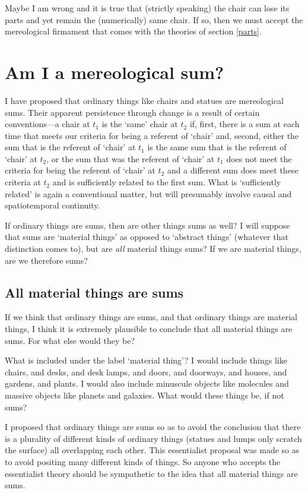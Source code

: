 \documentclass[11pt]{article}
\begin{document}
\begin{spacing}{1.5}
Maybe I am wrong and it is true that (strictly speaking) the chair can
lose its parts and yet remain the (numerically) same chair.  If so,
then we must accept the mereological firmament that comes with the
theories of section \ref{parts}.

\section{Am I a mereological sum?}
\label{i-sum}
I have proposed that ordinary things like chairs and statues are
mereological sums.  Their apparent persistence through change is a
result of certain conventions---a chair at $t_1$ is the `same' chair
at $t_2$ if, first, there is a sum at each time that meets our
criteria for being a referent of `chair' and, second, either the sum
that is the referent of `chair' at $t_1$ is the same sum that is the
referent of `chair' at $t_2$, or the sum that was the referent of
`chair' at $t_1$ does not meet the criteria for being the referent
of `chair' at $t_2$ and a different sum does meet these criteria at
$t_2$ and is sufficiently related to the first sum.  What is
`sufficiently related' is again a conventional matter, but will
presumably involve causal and spatiotemporal continuity.

If ordinary things are sums, then are other things sums as well?  I
will suppose that sums are `material things' as opposed to `abstract
things' (whatever that distinction comes to), but are {\em all}
material things sums?  If we are material things, are we therefore
sums?

\subsection{All material things are sums}
\label{material-sum}
If we think that ordinary things are sums, and that ordinary things
are material things, I think it is extremely plausible to conclude
that all material things are sums.  For what else would they be?

What is included under the label `material thing'?  I would include
things like chairs, and desks, and desk lamps, and doors, and
doorways, and houses, and gardens, and plants.  I would also include
minuscule objects like molecules and massive objects like planets and
galaxies.  What would these things be, if not sums?

I proposed that ordinary things are sums so as to avoid the conclusion
that there is a plurality of different kinds of ordinary things
(statues and lumps only scratch the surface) all overlapping each
other.  This essentialist proposal was made so as to avoid positing
many different kinds of things.  So anyone who accepts the
essentialist theory should be sympathetic to the idea that all
material things are sums.


\end{spacing}
\end{document}
